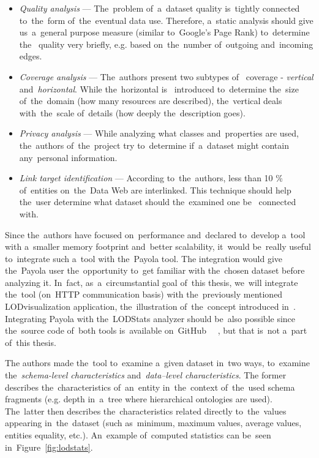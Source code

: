 \begin{itemize}
  \item \emph{Quality analysis} --- The~problem of~a~dataset quality is~tightly connected 
  to~the~form of~the~eventual data use. Therefore, a~static analysis should 
  give us~a~general purpose measure (similar to~Google's Page Rank) to~determine the~  quality very briefly, e.g. based on~the~number of~outgoing and~incoming 
  edges.
  
  \item \emph{Coverage analysis} --- The~authors present two subtypes of~  coverage - \emph{vertical} and~\emph{horizontal}.  While the~horizontal is~  introduced to~determine the~size of~the~domain (how many resources are described), the~vertical deals with~the~scale of~details (how deeply the~description goes).
  
  \item \emph{Privacy analysis} --- While analyzing what classes and~properties 
  are used, the~authors of~the~project try to~determine if~a~dataset 
  might contain any~personal information.
  
  \item \emph{Link target identification} --- According to~the~authors, less than 
  10 \% of~entities on~the~Data Web are interlinked. This technique 
  should help the~user determine what dataset should the~examined one be~  connected with.
\end{itemize}

Since the~authors have focused on~performance and~declared to~develop a~tool with a~smaller memory footprint and~better scalability, it~would be~really useful to~integrate such a~tool with the~Payola tool.
The integration would give the~Payola user the~opportunity to~get familiar with the~chosen dataset before analyzing it. In~fact, as~a~circumstantial goal of~this 
thesis, we~will integrate the~tool (on~HTTP communication basis) with the~previously mentioned 
LODvisualization application, the~illustration of~the~concept introduced 
in~\cite{ldvm}. Integrating Payola with the~LODStats analyzer should be~also 
possible since the~source code of~both tools is~available on~GitHub~\cite{github-payola} 
~\cite{github-lodstats}, but that is~not a~part of~this thesis.

The authors made the~tool to~examine a~given dataset in~two ways, to~examine 
the~\emph{schema-level characteristics} and~\emph{data--level characteristics}. 
The former describes the~characteristics of~an~entity in~the~context of~the~used 
schema fragments (e.g. depth in~a~tree where hierarchical ontologies are used). 
The~latter then describes the~characteristics related directly to~the~values 
appearing in~the~dataset (such as~minimum, maximum values, average values, entities equality, 
etc.). An~example of~computed statistics can be~seen in~Figure~\ref{fig:lodstats}.

